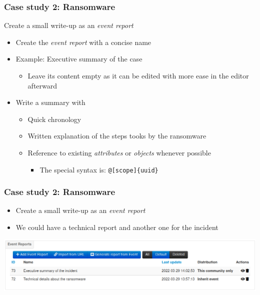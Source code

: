 \begin{frame}
    \frametitle{Case study 2: Ransomware}
    Create a small write-up as an \textit{event report}
    \begin{itemize}
        \item Create the \textit{event report} with a concise name
        \item Example: Executive summary of the case
        \begin{itemize}
            \item Leave its content empty as it can be edited with more ease in the editor afterward
        \end{itemize}
        \item Write a summary with
        \begin{itemize}
            \item Quick chronology
            \item Written explanation of the steps tooks by the ransomware
            \item Reference to existing \textit{attributes} or \textit{objects} whenever possible
            \begin{itemize}
                \item The special syntax is: \texttt{@[scope]\{uuid\}}
            \end{itemize}
        \end{itemize}
    \end{itemize}
\end{frame}

\begin{frame}
    \frametitle{Case study 2: Ransomware}
    \begin{itemize}
        \item Create a small write-up as an \textit{event report}
        \item We could have a technical report and another one for the incident
    \end{itemize}
    \begin{center}
        \includegraphics[width=1.0\linewidth]{pictures/case2/event-report-list.png}
    \end{center}
\end{frame}

